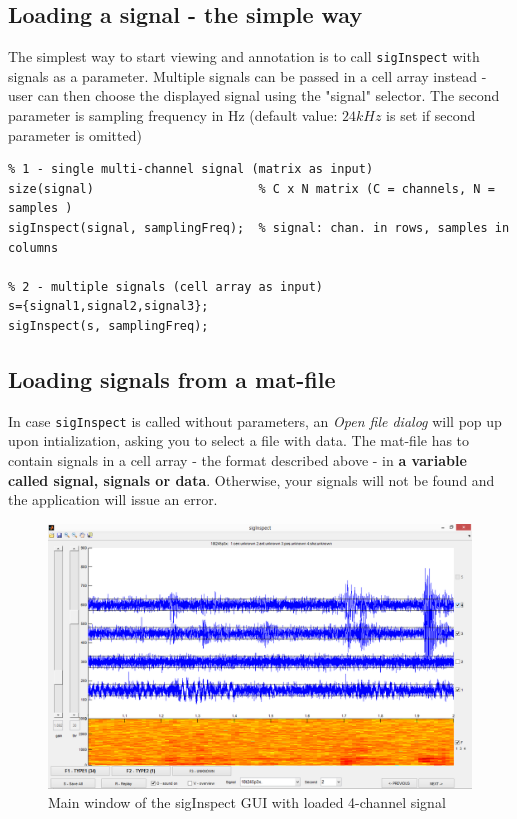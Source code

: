 \documentclass[a4paper,10pt]{article}
\begin{document}
\subsection{Loading a signal - the simple way}
The simplest way to start viewing and annotation is to call \verb|sigInspect| with signals as a parameter. Multiple signals can be passed in a cell array instead - user can then choose the displayed signal using the "signal" selector. The second parameter is sampling frequency in Hz (default value: $24 kHz$ is set if second parameter is omitted)
\begin{lstlisting} 
% 1 - single multi-channel signal (matrix as input)
size(signal)					   % C x N matrix (C = channels, N = samples )
sigInspect(signal, samplingFreq);  % signal: chan. in rows, samples in columns

% 2 - multiple signals (cell array as input) 
s={signal1,signal2,signal3}; 
sigInspect(s, samplingFreq); 
\end{lstlisting}

\subsection{Loading signals from a mat-file}
In case \verb|sigInspect| is called without parameters, an \emph{Open file dialog} will pop up upon intialization, asking you to select a  file with data. The mat-file has to contain signals in a cell array - the format described above - in \textbf{a variable called signal, signals or data}. Otherwise, your signals will not be found and the application will issue an error.

\begin{figure} [htb]
\centering
\includegraphics[width=1\textwidth]{sigInspectExploratory.png} 
\caption{Main window of the sigInspect GUI with loaded 4-channel signal}
\label{fig:sigInspectMainWindow}
\end{figure}
\end{document}
